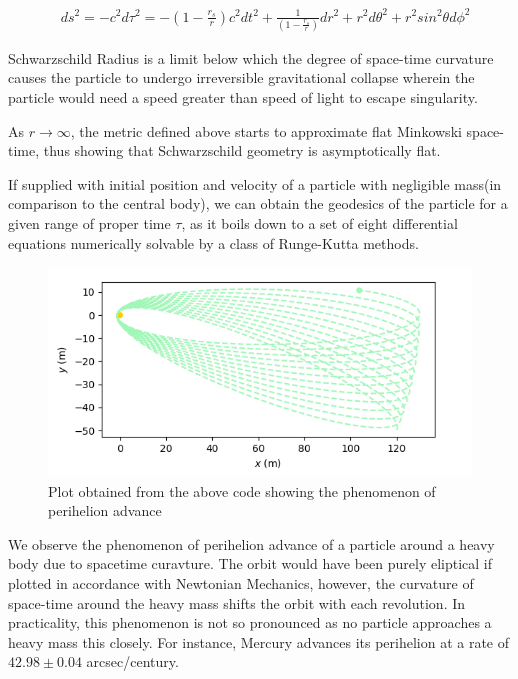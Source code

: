\documentclass[onecolumn]{aa}
\begin{document}
\begin{align}
& ds^2 = -c^2 d\tau ^2 = - (1 - \frac{r_s}{r})c^2 dt^2  + \frac{1}{(1 - \frac{r_s}{r})}dr^2 + r^2 d\theta ^2 + r^2 sin^2 \theta d\phi ^2
\end{align}

Schwarzschild Radius is a limit below which the degree of space-time curvature causes the particle to undergo irreversible gravitational collapse wherein the particle would need a speed greater than speed of light to escape singularity.

As $r \to \infty$, the metric defined above starts to approximate flat Minkowski space-time, thus showing that Schwarzschild geometry is asymptotically flat. 

If supplied with initial position and velocity of a particle with negligible mass(in comparison to the central body), we can obtain the geodesics of the particle for a given range of proper time $\tau$, as it boils down to a set of eight differential equations numerically solvable by a class of Runge-Kutta methods.


\begin{figure}[ht]
	\centering
	\includegraphics[scale=0.7]{figures/perihelion_cropped.png}
	\caption{Plot obtained from the above code showing the phenomenon of perihelion advance}
	\label{fig:schwarzschild}
\end{figure}

We observe the phenomenon of perihelion advance of a particle around a heavy body due to spacetime curavture. The orbit would have been purely eliptical if plotted in accordance with Newtonian Mechanics, however, the curvature of space-time around the heavy mass shifts the orbit with each revolution. In practicality, this phenomenon is not so pronounced as no particle approaches a heavy mass this closely. For instance, Mercury advances its perihelion at a rate of $42.98\pm 0.04$ arcsec/century.
\end{document}
